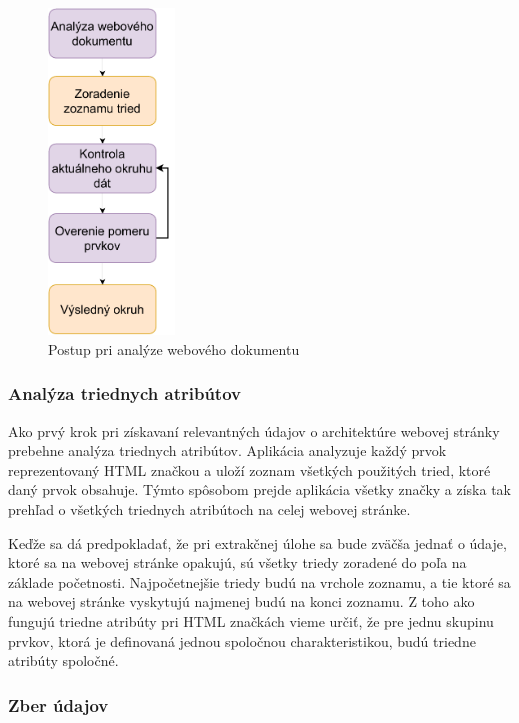  \begin{figure}[hbt]
	\centering
	\includegraphics[width=0.3\textwidth]{obrazky-figures/analysis.pdf}
	\caption{Postup pri analýze webového dokumentu}
	\label{analysispdf}
\end{figure}

\newpage

\subsubsection{Analýza triednych atribútov}

Ako prvý krok pri získavaní relevantných údajov o architektúre webovej stránky prebehne analýza triednych atribútov. Aplikácia analyzuje každý prvok reprezentovaný HTML značkou a uloží zoznam všetkých použitých tried, ktoré daný prvok obsahuje. Týmto spôsobom prejde aplikácia všetky značky a získa tak prehľad o všetkých triednych atribútoch na celej webovej stránke.

Keďže sa dá predpokladať, že pri extrakčnej úlohe sa bude zväčša jednať o údaje, ktoré sa na webovej stránke opakujú, sú všetky triedy zoradené do poľa na základe početnosti. Najpočetnejšie triedy budú na vrchole zoznamu, a tie ktoré sa na webovej stránke vyskytujú najmenej budú na konci zoznamu. Z toho ako fungujú triedne atribúty pri HTML značkách vieme určiť, že pre jednu skupinu prvkov, ktorá je definovaná jednou spoločnou charakteristikou, budú triedne atribúty spoločné. 


\subsubsection{Zber údajov}

